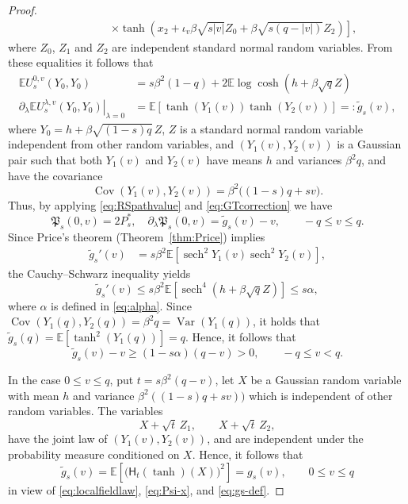 \documentclass[11pt]{article}
\numberwithin{equation}{section}
\newcommand{\E}{\mathbb{E}}
\newcommand{\1}{\mathbf 1}
\newcommand{\sech}{\operatorname{sech}}
\newcommand{\Cov}{\operatorname{Cov}}
\begin{document}
\begin{proof}
\begin{align}
&\qquad \qquad \left. \times \tanh (x_2 + \iota _v \beta \sqrt{s|v|}Z_0 + \beta \sqrt{s(q-|v|)}Z_2 )\right],
\end{align}
where $Z_0$, $Z_1$ and $Z_2$ are independent standard normal random variables. 
From these equalities it follows that
\begin{align*}
\E U_s^{0,v}(Y_0,Y_0) &= s\beta^2(1-q) + 2 \E \log\cosh (h + \beta \sqrt{q} Z ) \\
%
\left.\partial_\lambda \E U_s^{\lambda ,v}(Y_0,Y_0) \right|_{\lambda=0} &=\E \left[ \tanh (Y_1(v)) \tanh (Y_2(v) )\right]=:\tilde{g}_s(v),
\end{align*}
where $Y_0 = h +\beta \sqrt{(1-s)q}\,Z$, $Z$ is a standard normal random variable independent from other random variables, and $(Y_1(v),Y_2(v))$ is a  Gaussian pair such that both $Y_1(v)$ and $Y_2(v)$ have means $h$ and variances $\beta^2q$, and have the covariance
\[
 \Cov(Y_1(v),Y_2(v)) =\beta^2\bigl((1-s)q+sv\bigr).
\]
Thus, by applying \eqref{eq:RSpathvalue} and \eqref{eq:GTcorrection}  we have 
\begin{equation}
 \mathfrak P_s(0,v)=2P_s^*,
 \quad
 \partial_\lambda\mathfrak P_s(0,v)= \tilde{g}_s(v)-v , \qquad -q\le v\le q.
 \label{eq:GT-zero-signed-simple}
\end{equation}
Since Price's theorem (Theorem~\ref{thm:Price}) implies
\begin{align*}
\tilde{g}_s'(v) &= s\beta ^2 \E[\sech ^2 Y_1(v)\sech ^2 Y_2(v)],
\end{align*}
the Cauchy--Schwarz inequality yields
\[
 \tilde{g}_s'(v) \le s\beta ^2 \E[\sech ^4 (h+\beta\sqrt{q}Z)]\le s\alpha,
\]
where $\alpha$ is defined in \eqref{eq:alpha}.
Since $\Cov(Y_1(q),Y_2(q)) = \beta ^2 q = \operatorname{Var} (Y_1(q))$, it holds that $\tilde{g}_s (q) = \E[\tanh ^2 (Y_1(q))] =q$.
Hence, it follows that
\begin{equation}
\tilde{g}_s(v) -v
 \ge(1-s\alpha)(q-v)>0,
 \qquad -q\le v<q.
 \label{eq:GT-signed-positive-simple}
\end{equation}

In  the case $0\le v\le q$, put $t=s\beta^2(q-v)$, let
$X$ be a Gaussian random variable with mean $h$ and variance $\beta^2((1-s)q+sv))$ which is independent of other random variables.  
The variables
\[
 X+\sqrt t\,Z_1,
 \qquad X+\sqrt t\,Z_2,
\]
have the joint law of $(Y_1(v),Y_2(v))$, and are independent under the probability measure conditioned on $X$.
Hence, it follows that
\begin{equation}\label{eq:gv(0<v<q)}
 \tilde{g}_s(v) =\E\left[
 \bigl(\mathsf H_t(\tanh)(X)\bigr)^2
 \right]=g_s(v), \qquad 0\le v \le q
\end{equation}
in view of \eqref{eq:localfieldlaw}, \eqref{eq:Psi-x}, and \eqref{eq:gs-def}.


\end{proof}
\end{document}

